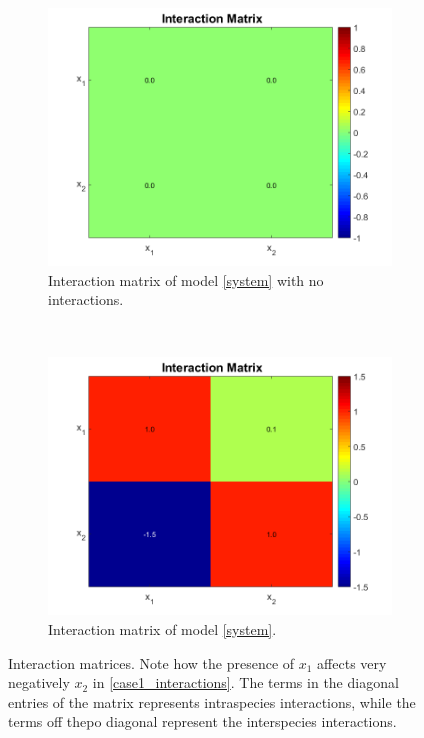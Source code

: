 \documentclass[3p,times]{article}
\begin{document}
\begin{figure}[h]
	\centering
	\begin{subfigure}[b]{0.45\textwidth}
		\includegraphics[width = \textwidth]{Stability/Interactions_case_study_1_no_interactions}
		\caption{Interaction matrix of model \eqref{system} with no interactions.}
		\label{case1_no_interactions}
	\end{subfigure}
	~
	\begin{subfigure}[b]{0.45\textwidth}
		\includegraphics[width = \textwidth]{Stability/Interactions_case_study_1}
		\caption{Interaction matrix of model \eqref{system}.}
		\label{case1_interactions}
	\end{subfigure}
	\caption{Interaction matrices. Note how the presence of $x_1$ affects very negatively $x_2$ in \eqref{case1_interactions}. The terms in the diagonal entries of the matrix represents intraspecies interactions, while the terms off thepo
		 diagonal represent the interspecies interactions.}
\end{figure} 
\end{document}
